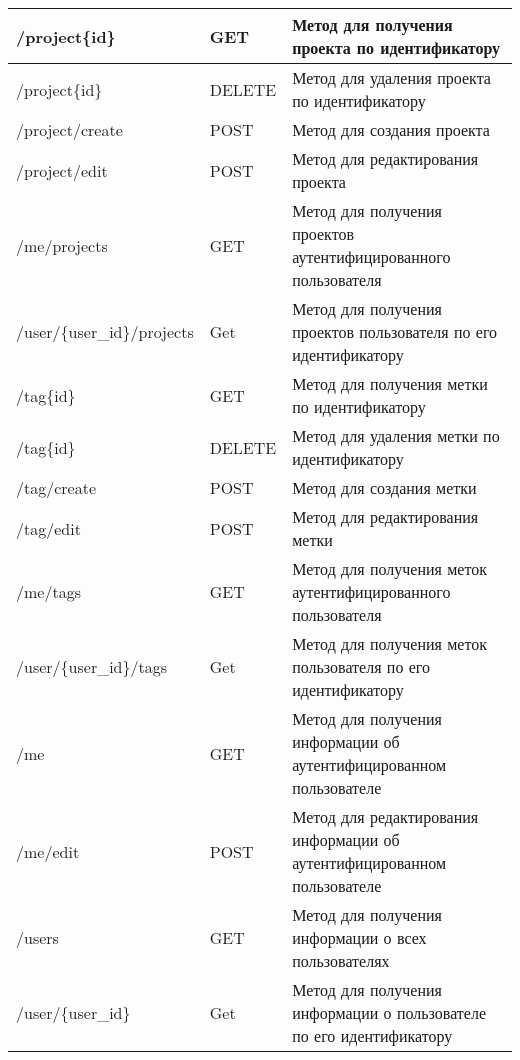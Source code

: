 \begin{landscape}
\begin{longtable}{|p{}|p{}|p{}|}
		/project\{id\}                & GET & Метод для получения проекта по идентификатору \\\hline
		/project\{id\}  				& DELETE & Метод для удаления проекта по идентификатору  \\\hline
		/project/create            & POST & Метод для создания проекта \\\hline
		/project/edit                & POST &  Метод для редактирования проекта \\\hline
		/me/projects              & GET & Метод для получения проектов аутентифицированного пользователя \\\hline
		/user/\{user\_id\}/projects                & Get & Метод для получения проектов пользователя  по его идентификатору \\\hline
		
		/tag\{id\}                & GET & Метод для получения метки по идентификатору \\\hline
		/tag\{id\}  				& DELETE & Метод для удаления метки по идентификатору  \\\hline
		/tag/create            & POST & Метод для создания метки \\\hline
		/tag/edit                & POST &  Метод для редактирования метки \\\hline
		/me/tags              & GET & Метод для получения меток аутентифицированного пользователя \\\hline
		/user/\{user\_id\}/tags                & Get & Метод для получения меток пользователя  по его идентификатору \\\hline
		
		/me                & GET & Метод для получения информации об аутентифицированном пользователе \\\hline
		/me/edit  				& POST & Метод для редактирования информации об аутентифицированном пользователе \\\hline
		/users           & GET & Метод для получения информации о всех пользователях  \\\hline
		/user/\{user\_id\}             & Get & Метод для получения информации о пользователе  по его идентификатору \\\hline
		

\end{longtable}
\end{landscape}
